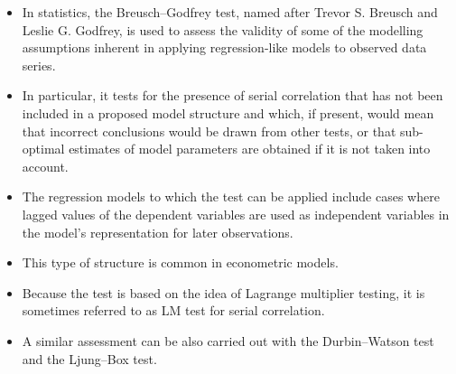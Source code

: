 \begin{itemize}
\item In statistics, the Breusch–Godfrey test, named after Trevor S. Breusch and Leslie G. Godfrey, is used to assess the validity of some of the modelling assumptions inherent in applying regression-like models to observed data series. 
\item In particular, it tests for the presence of serial correlation that has not been included in a proposed model structure and which, if present, would mean that incorrect conclusions would be drawn from other tests, or that sub-optimal estimates of model parameters are obtained if it is not taken into account. 
\item The regression models to which the test can be applied include cases where lagged values of the dependent variables are used as independent variables in the model's representation for later observations. 
\item This type of structure is common in econometric models.
\item Because the test is based on the idea of Lagrange multiplier testing, it is sometimes referred to as LM test for serial correlation.
\item A similar assessment can be also carried out with the Durbin–Watson test and the Ljung–Box test.
\end{itemize}


